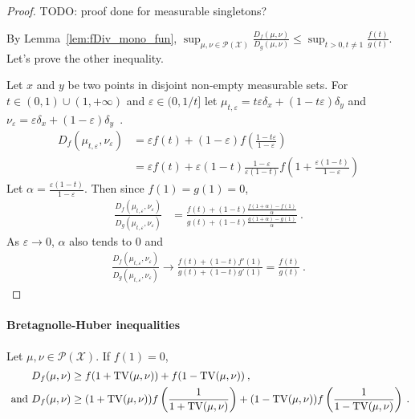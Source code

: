 \begin{proof}%
{}
TODO: proof done for measurable singletons?

By Lemma~\ref{lem:fDiv_mono_fun}, $\sup_{\mu, \nu \in \mathcal P(\mathcal X)} \frac{D_f(\mu, \nu)}{D_g(\mu, \nu)} \le \sup_{t > 0, t \ne 1} \frac{f(t)}{g(t)}$. Let's prove the other inequality.

Let $x$ and $y$ be two points in disjoint non-empty measurable sets. For $t \in (0,1) \cup (1, +\infty)$ and $\varepsilon \in (0, 1/t]$ let $\mu_{t, \varepsilon} = t \varepsilon \delta_x + (1 - t \varepsilon) \delta_y$ and $\nu_\varepsilon = \varepsilon \delta_x + (1 - \varepsilon) \delta_y$~.
\begin{align*}
D_f(\mu_{t, \varepsilon}, \nu_\varepsilon)
&= \varepsilon f(t) + (1 - \varepsilon) f(\frac{1 - t \varepsilon}{1 - \varepsilon})
\\
&= \varepsilon f(t) + \varepsilon (1 - t) \frac{1 - \varepsilon}{\varepsilon (1 - t)} f(1 + \frac{\varepsilon(1 - t)}{1 - \varepsilon})
\end{align*}
Let $\alpha = \frac{\varepsilon (1 - t)}{1 - \varepsilon}$. Then since $f(1) = g(1) = 0$,
\begin{align*}
\frac{D_f(\mu_{t, \varepsilon}, \nu_\varepsilon)}{D_g(\mu_{t, \varepsilon}, \nu_\varepsilon)}
&= \frac{f(t) + (1 - t)\frac{f(1 + \alpha) - f(1)}{\alpha}}{g(t) + (1 - t)\frac{g(1 + \alpha) - g(1)}{\alpha}} \: .
\end{align*}
As $\varepsilon \to 0$, $\alpha$ also tends to 0 and
\begin{align*}
\frac{D_f(\mu_{t, \varepsilon}, \nu_\varepsilon)}{D_g(\mu_{t, \varepsilon}, \nu_\varepsilon)}
\to \frac{f(t) + (1 - t)f'(1)}{g(t) + (1 - t)g'(1)}
= \frac{f(t)}{g(t)}
\: .
\end{align*}
\end{proof}

\paragraph{Bretagnolle-Huber inequalities}

\begin{theorem}
  \label{thm:bh_fDiv}
  \leanok
  Let $\mu, \nu \in \mathcal P(\mathcal X)$. If $f(1) = 0$,
  \begin{align*}
  D_f(\mu, \nu)
  &\ge f(1 + \operatorname{TV}(\mu, \nu)) + f(1 - \operatorname{TV}(\mu, \nu))
  \: , \\
  \text{ and }
  D_f(\mu, \nu)
  &\ge (1 + \operatorname{TV}(\mu, \nu))f\left(\frac{1}{1 + \operatorname{TV}(\mu, \nu)}\right) + (1 - \operatorname{TV}(\mu, \nu))f\left(\frac{1}{1 - \operatorname{TV}(\mu, \nu)}\right)
  \: .
  \end{align*}
\end{theorem}

